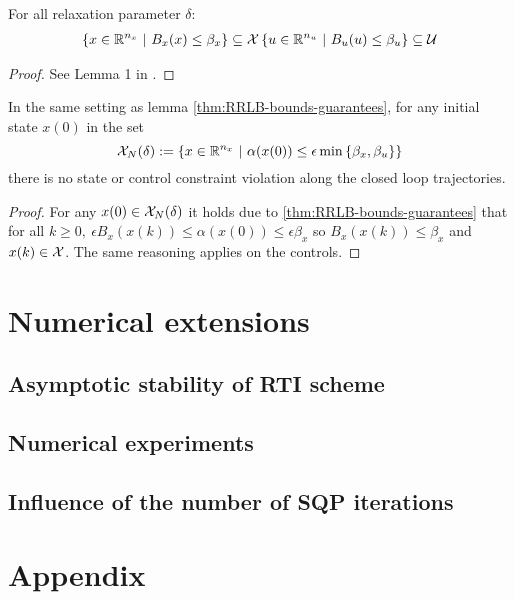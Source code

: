 \documentclass[12pt]{article}
\begin{document}
\begin{lemma}
	\label{thm:constraint-set-def-with-RRLB}
	For all relaxation parameter $\delta$:
	\begin{align*}
		\left\{x\in\R^{n_x}~|~B_x(x)\leq\beta_x\right\}\subseteq\cal{X}
		\left\{u\in\R^{n_u}~|~B_u(u)\leq\beta_u\right\}\subseteq\cal{U}
	\end{align*}
\end{lemma}

\begin{proof}
	See Lemma 1 in \cite{RRLB-linear-MPC}.
\end{proof}

\begin{theorem}
	In the same setting as lemma \ref{thm:RRLB-bounds-guarantees}, for any initial state $x(0)$ in the set
	$$\cal{X}_N(\delta):=\left\{x\in\R^{n_x}~|~\alpha(x(0))\leq\epsilon\min\left\{\beta_x,\beta_u\right\}\right\}$$
	there is no state or control constraint violation along the closed loop trajectories.
\end{theorem}

\begin{proof}
	For any $x(0)\in\cal{X}_N(\delta)$ it holds due to \ref{thm:RRLB-bounds-guarantees} that for all $k\geq 0,~\epsilon B_x(x(k))\leq\alpha(x(0))\leq\epsilon\beta_x$ so $B_x(x(k))\leq \beta_x$ and $x(k)\in\cal{X}$.
	The same reasoning applies on the controls.
\end{proof}

\section{Numerical extensions}\label{sec:numerical-extensions}

\subsection{Asymptotic stability of RTI scheme}\label{sec:RRLB-real-time-stability}
\subsection{Numerical experiments}\label{sec:RRLB-numerical-experiments}
\subsection{Influence of the number of SQP iterations}\label{sec:RRLB-SQP-iterations}

\newpage

\section{Appendix}
\printbibliography
\end{document}
